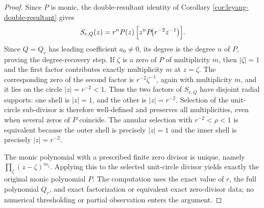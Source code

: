 \begin{proof}
Since \(P\) is monic, the double-resultant identity of Corollary \ref{cor:leyang-double-resultant} gives
\[
S_{r,Q}(z)=r^n P(z)\,\Bigl[z^nP\!\bigl(r^{-2}z^{-1}\bigr)\Bigr].
\]
Since \(Q=Q_r\) has leading coefficient \(a_0\ne0\), its degree is the degree \(n\) of \(P\), proving the degree-recovery step.  If \(\zeta\) is a zero of \(P\) of multiplicity \(m\), then \(|\zeta|=1\) and the first factor contributes exactly multiplicity \(m\) at \(z=\zeta\).  The corresponding zero of the second factor is \(r^{-2}\zeta^{-1}\), again with multiplicity \(m\), and it lies on the circle \(|z|=r^{-2}<1\).  Thus the two factors of \(S_{r,Q}\) have disjoint radial supports: one shell is \(|z|=1\), and the other is \(|z|=r^{-2}\).  Selection of the unit-circle sub-divisor is therefore well-defined and preserves all multiplicities, even when several zeros of \(P\) coincide.  The annular selection with \(r^{-2}<\rho<1\) is equivalent because the outer shell is precisely \(|z|=1\) and the inner shell is precisely \(|z|=r^{-2}\).

The monic polynomial with a prescribed finite zero divisor is unique, namely \(\prod_\zeta (z-\zeta)^{m_\zeta}\).  Applying this to the selected unit-circle divisor yields exactly the original monic polynomial \(P\).  The computation uses the exact value of \(r\), the full polynomial \(Q_r\), and exact factorization or equivalent exact zero-divisor data; no numerical thresholding or partial observation enters the argument.
\end{proof}

